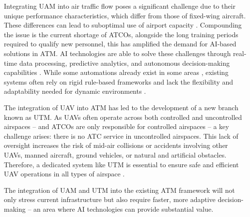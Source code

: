 Integrating \gls{UAM} into air traffic flow poses a significant challenge due to their unique performance characteristics, which differ from those of fixed-wing aircraft.
These differences can lead to suboptimal use of airport capacity \cite{Schuchardt_2023}.
Compounding the issue is the current shortage of \glspl{ATCO}, alongside the long training periods required to qualify new personnel, this has amplified the demand for \gls{AI}-based solutions in \gls{ATM}. 
\gls{AI} technologies are able to solve these challenges through real-time data processing, predictive analytics, and autonomous decision-making capabilities \cite{Ramachandran_2025}. 
While some automations already exist in some areas \cite{skybrary2025automation}, existing systems often rely on rigid rule-based frameworks and lack the flexibility and adaptability needed for dynamic environments \cite{Meier_2024}. 

The integration of \gls{UAV} into \gls{ATM} has led to the development of a new branch known as \gls{UTM}.
As \glspl{UAV} often operate across both controlled and uncontrolled airspaces -- and \glspl{ATCO} are only responsible for controlled airspaces -- a key challenge arises: there is no \gls{ATC} service in uncontrolled airspaces.
This lack of oversight increases the risk of mid-air collisions or accidents involving other \glspl{UAV}, manned aircraft, ground vehicles, or natural and artificial obstacles.
Therefore, a dedicated system like \gls{UTM} is essential to ensure safe and efficient \gls{UAV} operations in all types of airspace \cite{Zsolt_2017}.

The integration of \gls{UAM} and \gls{UTM} into the existing \gls{ATM} framework will not only stress current infrastructure but also require faster, more adaptive decision-making \cite{Rumba_2020} -- an area where \gls{AI} technologies can provide substantial value.








